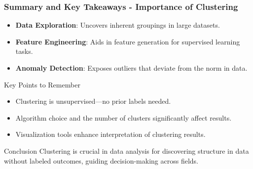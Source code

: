 \documentclass[aspectratio=169]{beamer}
\begin{document}
\begin{frame}[fragile]
    \frametitle{Summary and Key Takeaways - Importance of Clustering}
    \begin{itemize}
        \item \textbf{Data Exploration}: Uncovers inherent groupings in large datasets.
        \item \textbf{Feature Engineering}: Aids in feature generation for supervised learning tasks.
        \item \textbf{Anomaly Detection}: Exposes outliers that deviate from the norm in data.
    \end{itemize}
    
    \begin{block}{Key Points to Remember}
        \begin{itemize}
            \item Clustering is unsupervised—no prior labels needed.
            \item Algorithm choice and the number of clusters significantly affect results.
            \item Visualization tools enhance interpretation of clustering results.
        \end{itemize}
    \end{block}
    
    \begin{block}{Conclusion}
        Clustering is crucial in data analysis for discovering structure in data without labeled outcomes, guiding decision-making across fields.
    \end{block}
\end{frame}
\end{document}
